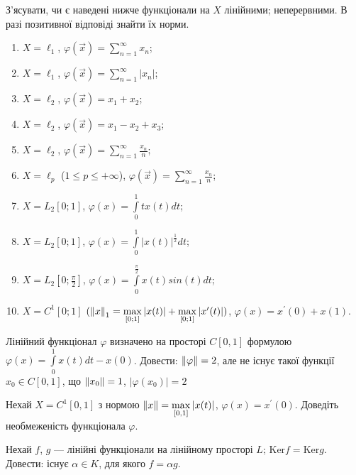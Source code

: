 \begin{exercise}
    З'ясувати, чи є наведені нижче функціонали на $X$ лінійними; 
    неперервними. В разі позитивної відповіді знайти їх норми.
    \begin{enumerate}[label=\ukr*)]
        \item $X = \ell_1$, $\varphi(\vec{x}) = \sum\limits_{n=1}^{\infty} x_n $;
        \item $X = \ell_1$, $\varphi(\vec{x}) = \sum\limits_{n=1}^{\infty} |x_n| $;
        \item $X = \ell_2$, $\varphi(\vec{x}) = x_1 + x_2 $;
        \item $X = \ell_2$, $\varphi(\vec{x}) = x_1 - x_2 + x_3$;
        \item $X = \ell_2$, $\varphi(\vec{x}) = \sum\limits_{n=1}^{\infty} \frac{x_n}{n}$;
        \item $X = \ell_p$ ($1 \leq p \leq +\infty$), $\varphi(\vec{x}) = 
        \sum\limits_{n=1}^{\infty} \frac{x_n}{n}$;
        \item $X = L_2[0;1]$, $\varphi(x) = \int\limits_0^1 tx(t)dt$;
        \item $X = L_2[0;1]$, $\varphi(x) = \int\limits_0^1 |x(t)|^{\frac{1}{2}}dt$;
        \item $X = L_2[0;\frac{\pi}{2}]$,
        $\varphi(x) = \int\limits_0^{\frac{\pi}{2}} x(t)sin(t)dt$;
        \item $X = C^1[0;1]$ $(\left\lVert x\right\rVert_1 = \max\limits_{[0;1]}|x(t)| + 
        \max\limits_{[0;1]}|x^{\prime}(t)|)$, $\varphi(x) = x^{\prime}(0) + x(1)$.
    \end{enumerate}
\end{exercise}

\begin{exercise}
    Лінійний функціонал $\varphi$ визначено на просторі $C[0, 1]$ формулою 
    $\varphi(x) = \int\limits_0^1 x(t)dt - x(0)$. Довести: $\left\lVert\varphi\right\rVert = 2$, 
    але не існує такої функції $x_0 \in C[0, 1]$, що $\left\lVert x_0\right\rVert = 1$, $|\varphi(x_0)| = 2$
\end{exercise}

\begin{exercise}
    Нехай $X = C^1[0, 1]$ з нормою $\left\lVert x\right\rVert = \max\limits_{[0, 1]}|x(t)|$, 
    $\varphi(x) = x^\prime(0)$. Доведіть необмеженість функціонала $\varphi$.
\end{exercise}

\begin{exercise}
    Нехай $f$, $g$ --- лінійні функціонали на лінійному просторі $L$; $\mathrm{Ker} f = \mathrm{Ker} g$. 
    Довести: існує $\alpha \in K$, для якого $f = \alpha g$.
\end{exercise}


